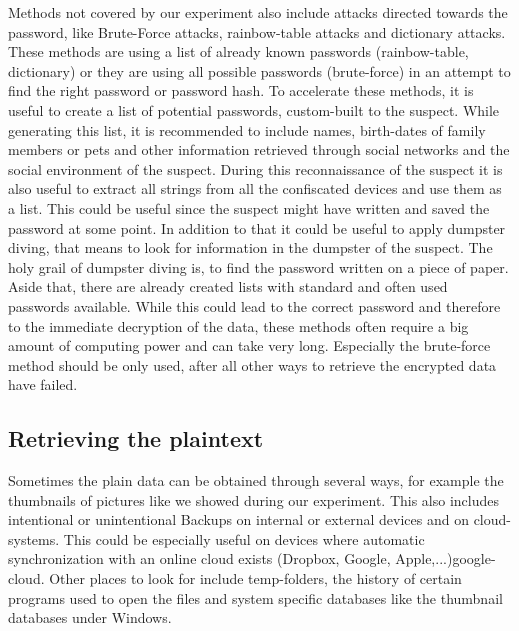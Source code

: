 Methods not covered by our experiment also include attacks directed towards the password, like Brute-Force attacks, rainbow-table attacks and dictionary attacks. These methods are using a list of already known passwords (rainbow-table, dictionary) or they are using all possible passwords (brute-force) in an attempt to find the right password or password hash.
To accelerate these methods, it is useful to create a list of potential passwords, custom-built to the suspect. While generating this list, it is recommended to include names, birth-dates of family members or pets and other information retrieved through social networks and the social environment of the suspect. During this reconnaissance of the suspect it is also useful to extract all strings from all the confiscated devices and use them as a list. This could be useful since the suspect might have written and saved the password at some point. In addition to that it could be useful to apply dumpster diving, that means to look for information in the dumpster of the suspect. 
The holy grail of dumpster diving is, to find the password written on a piece of paper. 
Aside that, there are already created lists with standard and often used passwords available.
While this could lead to the correct password and therefore to the immediate decryption of the data, these methods often require a big amount of
computing power and can take very long.
Especially the brute-force method should be only used, after all other ways to retrieve the encrypted data have failed.

\subsection{Retrieving the plaintext}
Sometimes the plain data can be obtained through several ways, for example the thumbnails of pictures like we showed during our experiment. This also includes intentional or unintentional Backups on internal or external devices and on cloud-systems.
This could be especially useful on devices where automatic synchronization with an online cloud exists (Dropbox, Google, Apple,...)google-cloud. Other places to look for include temp-folders, the history of certain programs used to open the files and system specific databases like the thumbnail databases under Windows.
